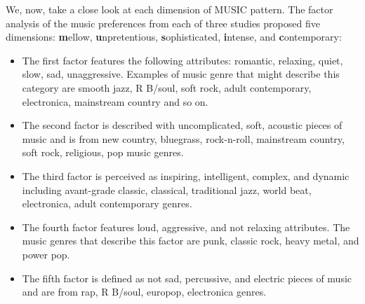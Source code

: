 \par We, now, take a close look at each dimension of MUSIC pattern. The factor analysis of the music preferences from each of three studies proposed five dimensions: \textbf{m}ellow, \textbf{u}npretentious, \textbf{s}ophisticated, \textbf{i}ntense, and \textbf{c}ontemporary:
\begin{itemize}
\item The first factor features the following attributes: romantic, relaxing, quiet, slow, sad, unaggressive. Examples of music genre that might describe this category are smooth jazz, R B/soul, soft rock, adult contemporary, electronica, mainstream country and so on. 
\item The second factor is described with uncomplicated, soft, acoustic pieces of music and is from new country, bluegrass, rock-n-roll, mainstream country, soft rock, religious, pop music genres. 
\item The third factor is perceived as inspiring, intelligent, complex, and dynamic including avant-grade classic, classical, traditional jazz, world beat, electronica, adult contemporary genres. 
\item The fourth factor features loud, aggressive, and not relaxing attributes. The music genres that describe this factor are punk, classic rock, heavy metal, and power pop. 
\item The fifth factor is defined as not sad, percussive, and electric pieces of music and are from rap, R B/soul, europop, electronica genres.
\end{itemize}

